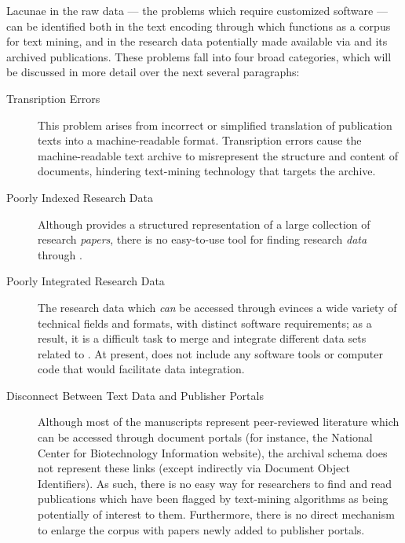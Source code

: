 \documentclass[11pt,letterpaper]{article}
\newcommand{\Covid}{\resizebox{!}{7pt}{\AcronymText{Covid-19}}}
\newcommand{\textscc}[1]{{\color{orr!35!black}{{%
						\fontfamily{Cabin-TLF}\fontseries{b}\selectfont{\textsc{\scriptsize{#1}}}}}}}
\newcommand{\AcronymText}[1]{{\textscc{#1}}}
\newcommand{\Cnineteen}{\resizebox{!}{7pt}{\AcronymText{CORD-19}}}
\newcommand{\p}[1]{

\vspace{.75em}#1}
\begin{document}
\p{Lacunae in the raw \Cnineteen{} data 
--- the problems which require customized \Cnineteen{} software --- 
can be identified both in the text encoding through which 
\Cnineteen{} functions as a corpus for text mining, and 
in the research data potentially made 
available via \Cnineteen{} and its archived publications.  
These problems fall into four broad categories, 
which will be discussed in more detail over the 
next several paragraphs: 

\begin{description}
	
\item[Transription Errors]  This problem 
arises from incorrect or simplified translation 
of publication texts into a machine-readable 
format.  Transription errors cause the machine-readable 
text archive to misrepresent the structure 
and content of documents, hindering text-mining 
technology that targets the archive.

\item[Poorly Indexed Research Data]  Although 
\Cnineteen{} provides a structured representation 
of a large collection of research 
\textit{papers}, there is no easy-to-use tool 
for finding research \textit{data} 
through \Cnineteen{}.

\item[Poorly Integrated Research Data]  The 
research data which \textit{can} be 
accessed through \Cnineteen{} evinces 
a wide variety of technical fields 
and formats, with distinct software 
requirements; as a result, it is a 
difficult task to merge and integrate 
different data sets related to 
\Covid{}.  At present, \Cnineteen{} 
does not include any software tools 
or computer code that would facilitate 
data integration.   

\item[Disconnect Between Text Data and Publisher Portals]  
Although most of the \Cnineteen{} manuscripts represent 
peer-reviewed literature which can be accessed through 
document portals (for instance, the 
National Center for Biotechnology Information website), 
the \Cnineteen{} archival schema does not represent 
these links (except indirectly via Document Object 
Identifiers).  As such, there is no easy way for 
researchers to find and read publications which have been 
flagged by text-mining algorithms as being potentially 
of interest to them.  Furthermore, there is no direct 
mechanism to enlarge the \Cnineteen{} corpus with papers 
newly added to publisher portals.
\end{description}}
\end{document}
